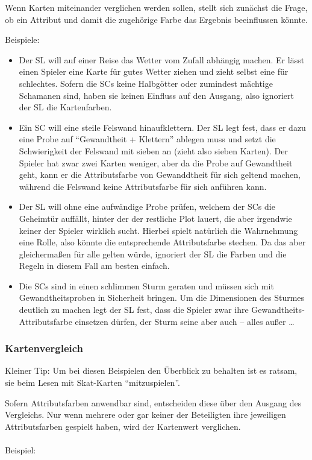 Wenn Karten miteinander verglichen werden sollen, stellt sich zunächst die Frage, ob ein Attribut und damit die zugehörige Farbe das Ergebnis beeinflussen könnte.

Beispiele:
\begin {itemize}
\item Der SL will auf einer Reise das Wetter vom Zufall abhängig machen. Er lässt einen Spieler eine Karte für gutes Wetter ziehen und zieht selbst eine für schlechtes. Sofern die SCs keine Halbgötter oder zumindest mächtige Schamanen sind, haben sie keinen Einfluss auf den Ausgang, also ignoriert der SL die Kartenfarben.
\item Ein SC will eine steile Felswand hinaufklettern. Der SL legt fest, dass er dazu eine Probe auf "`Gewandtheit + Klettern"' ablegen muss und setzt die Schwierigkeit der Felswand mit sieben an (zieht also sieben Karten). Der Spieler hat zwar zwei Karten weniger, aber da die Probe auf Gewandtheit geht, kann er die Attributsfarbe von Gewanddtheit für sich geltend machen, während die Felswand keine Attributsfarbe für sich anführen kann.
\item Der SL will ohne eine aufwändige Probe prüfen, welchem der SCs die Geheimtür auffällt, hinter der der restliche Plot lauert, die aber irgendwie keiner der Spieler wirklich sucht. Hierbei spielt natürlich die Wahrnehmung eine Rolle, also könnte die entsprechende Attributsfarbe stechen. Da das aber gleichermaßen für alle gelten würde, ignoriert der SL die Farben und die Regeln in diesem Fall am besten einfach.
\item Die SCs sind in einen schlimmen Sturm geraten und müssen sich mit Gewandtheitsproben in Sicherheit bringen. Um die Dimensionen des Sturmes deutlich zu machen legt der SL fest, dass die Spieler zwar ihre Gewandtheits-Attributsfarbe einsetzen dürfen, der Sturm seine aber auch -- alles außer \herz\dots
\end {itemize}

\subsubsection {Kartenvergleich}

Kleiner Tip: Um bei diesen Beispielen den Überblick zu behalten ist es ratsam, sie beim Lesen mit Skat-Karten "`mitzuspielen"'.

Sofern Attributsfarben anwendbar sind, entscheiden diese über den Ausgang des Vergleichs. Nur wenn mehrere oder gar keiner der Beteiligten ihre jeweiligen Attributsfarben gespielt haben, wird der Kartenwert verglichen.
\\
\\
Beispiel:

